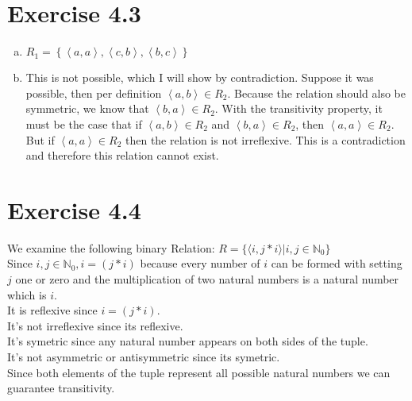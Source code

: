 \documentclass{article} %
\newcommand{\homeworkNumber}{4}
\begin{document}
\section*{Exercise \homeworkNumber.3}
\begin{enumerate}[(a)]
	\item \( R_{1} = \left\{ \left< a,a \right>, \left< c,b \right>,\left< b,c \right> \right\}  \)
	\item This is not possible, which I will show by contradiction.
	      Suppose it was possible, then per definition \( \left< a,b \right> \in  R_{2}\).
	      Because the relation should also be symmetric, we know that \( \left< b,a \right> \in R_{2}\).
	      With the transitivity property, it must be the case that if \( \left< a,b \right> \in R_{2} \)
	      and \( \left< b,a \right> \in R_{2}\), then \( \left< a,a \right> \in R_{2} \).
	      But if \( \left< a,a \right> \in R_{2} \) then the relation is not irreflexive.
	      This is a contradiction and therefore this relation cannot exist.

\end{enumerate}

\section*{Exercise \homeworkNumber.4}
We examine the following binary Relation: $R = \{ \langle i,j*i \rangle \lvert i,j \in \mathbb N_0\}$ \\
Since $ i,j \in \mathbb N_0 , i = (j*i)$ because every number of $i$ can be formed with setting $j$ one or zero and the multiplication of two natural numbers is a natural number which is $i$.\\
It is reflexive since $i = (j*i)$. \\
It's not irreflexive since its reflexive. \\
It's symetric since any natural number appears on both sides of the tuple. \\
It's not asymmetric or antisymmetric since its symetric. \\
Since both elements of the tuple represent all possible natural numbers we can guarantee transitivity. \\
\end{document}
